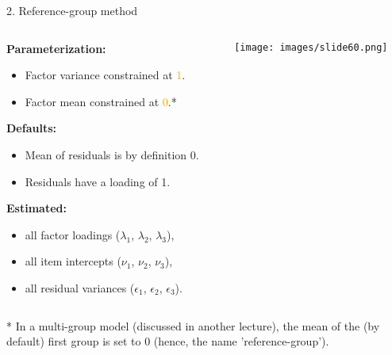 \documentclass[10pt]{beamer}\usepackage[]{graphicx}\usepackage[]{xcolor}
\begin{document}
%
\begin{frame}{2. Reference-group method}

    \begin{columns}[T] %
    \begin{column}{.65\textwidth}
    
    \textbf{Parameterization:}
        \begin{itemize}
            \item Factor variance constrained at \textcolor{orange}{1}.
            \item Factor mean constrained at \textcolor{orange}{0}.*
        \end{itemize} 
        \textbf{Defaults:}
        \begin{itemize}
            \item Mean of residuals is by definition 0.
            \item Residuals have a loading of 1.
        \end{itemize} 
        \textbf{Estimated:}
        \begin{itemize}
            \item all factor loadings ($\lambda_1$, $\lambda_2$, $\lambda_3$),
            \item all item intercepts ($\nu_1$, $\nu_2$, $\nu_3$), 
            \item all residual variances ($\epsilon_1$, $\epsilon_2$, $\epsilon_3$).
        \end{itemize}
    
    \end{column}%
    
    \hfill%
    \begin{column}{.34\textwidth}
        \texttt{[image: images/slide60.png]}
    \end{column}%
    \end{columns}
    
    \vspace{5mm}
    
    * In a multi-group model (discussed in another lecture), the mean of the (by default) first group is set to 0 (hence, the name 'reference-group').
    
\end{frame}
%
\end{document}

